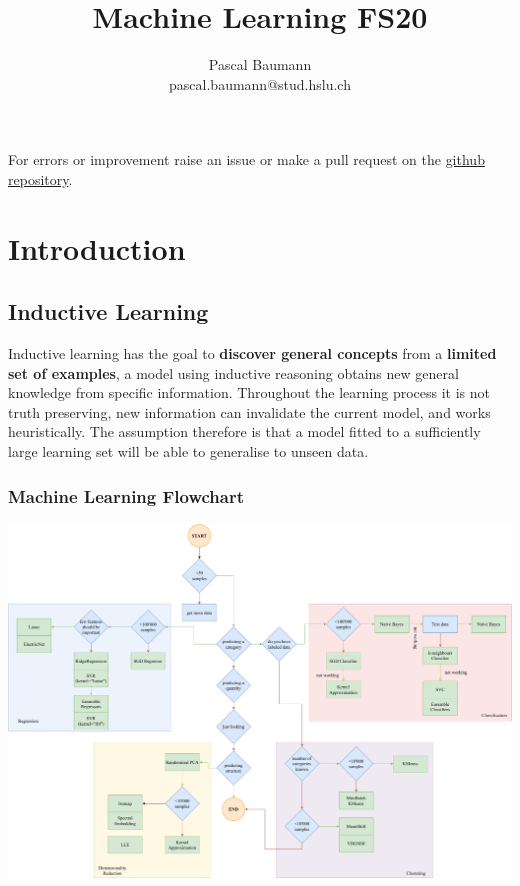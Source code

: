 \documentclass[11pt]{article}
\theoremstyle{definition}
\begin{document}
	
\title{Machine Learning FS20}
\author{Pascal Baumann\\pascal.baumann@stud.hslu.ch}
\maketitle



For errors or improvement raise an issue or make a pull request on the \href{https://github.com/KilnOfTheSecondFlame/mse_summaries}{github repository}.

\tableofcontents
\newpage



\section{Introduction}

\subsection{Inductive Learning}

Inductive learning has the goal to \textbf{discover general concepts} from a \textbf{limited set of examples}, a model using inductive reasoning obtains new general knowledge from specific information. Throughout the learning process it is not truth preserving, new information can invalidate the current model, and works heuristically. The assumption therefore is that a model fitted to a sufficiently large learning set will be able to generalise to unseen data.

\begin{landscape}
	\subsubsection{Machine Learning Flowchart}
	\begin{center}
		\includegraphics[height=0.9\textheight, keepaspectratio]{scikit-learn_algorithm_cheatsheet}
	\end{center}
\end{landscape}
\end{document}
